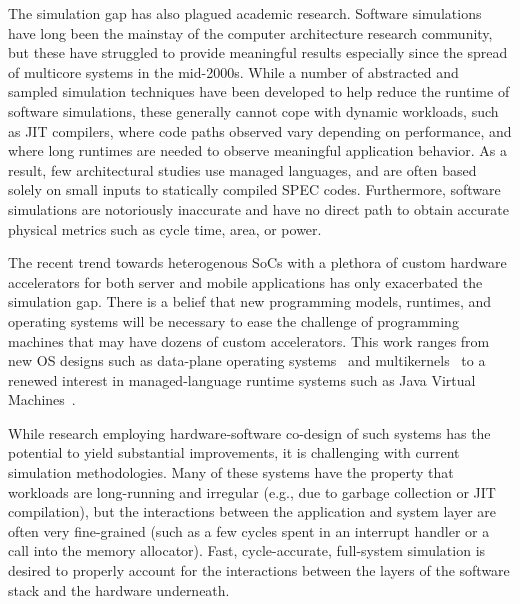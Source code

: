 The simulation gap has also plagued academic research. Software simulations
have long been the mainstay of the computer architecture research community,
but these have struggled to provide meaningful results especially since the
spread of multicore systems in the mid-2000s.  While a number of abstracted and
sampled simulation techniques have been developed to help reduce the runtime of
software simulations, these generally cannot cope with dynamic workloads, such
as JIT compilers, where code paths observed vary depending on performance, and
where long runtimes are needed to observe meaningful application behavior.  As
a result, few architectural studies use managed languages, and are often based
solely on small inputs to statically compiled SPEC codes.  Furthermore,
software simulations are notoriously inaccurate and have no direct path to
obtain accurate physical metrics such as cycle time, area, or power.

The recent trend towards heterogenous SoCs with a plethora of custom hardware
accelerators for both server and mobile applications has only exacerbated the
simulation gap. There is a belief that new programming models, runtimes, and
operating systems will be necessary to ease the challenge of programming
machines that may have dozens of custom accelerators. This work ranges from new
OS designs such as data-plane operating systems~\cite{arrakis} and
multikernels~\cite{barrelfish} to a renewed interest in managed-language
runtime systems such as Java Virtual Machines~\cite{broom,taurus}.

While research employing hardware-software co-design of such systems has the
potential to yield substantial improvements, it is challenging with current
simulation methodologies.  Many of these systems have the property that
workloads are long-running and irregular (e.g., due to garbage collection or
JIT compilation), but the interactions between the application and system layer
are often very fine-grained (such as a few cycles spent in an interrupt handler
or a call into the memory allocator).  Fast, cycle-accurate, full-system
simulation is desired to properly account for the interactions between the
layers of the software stack and the hardware underneath.


